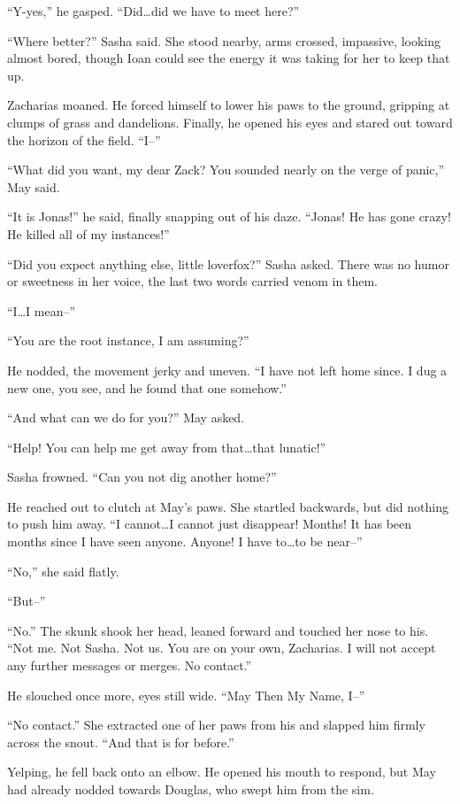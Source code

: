 ``Y-yes,'' he gasped. ``Did\ldots did we have to meet here?''

``Where better?'' Sasha said. She stood nearby, arms crossed, impassive, looking almost bored, though Ioan could see the energy it was taking for her to keep that up.

Zacharias moaned. He forced himself to lower his paws to the ground, gripping at clumps of grass and dandelions. Finally, he opened his eyes and stared out toward the horizon of the field. ``I--''

``What did you want, my dear Zack? You sounded nearly on the verge of panic,'' May said.

``It is Jonas!'' he said, finally snapping out of his daze. ``Jonas! He has gone crazy! He killed all of my instances!''

``Did you expect anything else, little loverfox?'' Sasha asked. There was no humor or sweetness in her voice, the last two words carried venom in them.

``I\ldots I mean--''

``You are the root instance, I am assuming?''

He nodded, the movement jerky and uneven. ``I have not left home since. I dug a new one, you see, and he found that one somehow.''

``And what can we do for you?'' May asked.

``Help! You can help me get away from that\ldots that lunatic!''

Sasha frowned. ``Can you not dig another home?''

He reached out to clutch at May's paws. She startled backwards, but did nothing to push him away. ``I cannot\ldots I cannot just disappear! Months! It has been months since I have seen anyone. Anyone! I have to\ldots to be near--''

``No,'' she said flatly.

``But--''

``No.'' The skunk shook her head, leaned forward and touched her nose to his. ``Not me. Not Sasha. Not us. You are on your own, Zacharias. I will not accept any further messages or merges. No contact.''

He slouched once more, eyes still wide. ``May Then My Name, I--''

``No contact.'' She extracted one of her paws from his and slapped him firmly across the snout. ``And that is for before.''

Yelping, he fell back onto an elbow. He opened his mouth to respond, but May had already nodded towards Douglas, who swept him from the sim.

